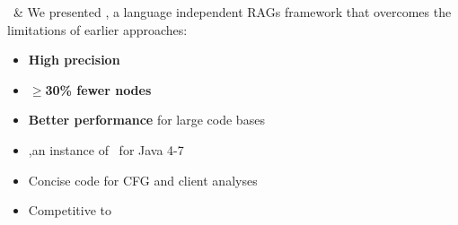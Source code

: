\begin{frame}{\intracfgs\ \& \intrajs}
   We presented \intracfgs, a language independent RAGs framework that overcomes the limitations of earlier approaches:
	\begin{itemize}
	\item \textbf{High precision}
	\item \textbf{$\ge$30\% fewer nodes}
	\item\textbf{Better performance} for large code bases
\end{itemize}
    \begin{itemize}
        \item<2-> \intrajs,an instance of \intracfgs\ for Java 4-7 \\ \vspace{0.1cm}
        \item<3-> Concise code for CFG and client analyses \\ \vspace{0.1cm}
        \item<4-> Competitive to   \\ \vspace{0.1cm}
    \end{itemize}

\begin{center}
\end{center}
\end{frame}